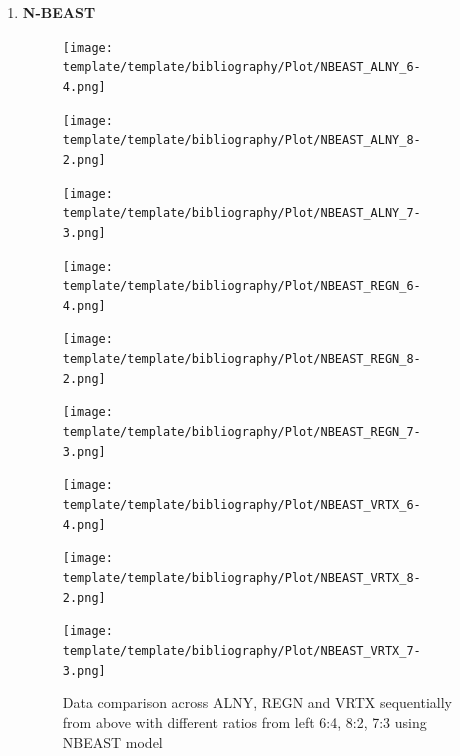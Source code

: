 \documentclass{ieeeojies}
\begin{document}
\begin{enumerate}
\item \textbf{N-BEAST} 
  \begin{figure}[H]
    \centering
    \begin{minipage}{0.155\textwidth}
    \centering
    \texttt{[image: template/template/bibliography/Plot/NBEAST\_ALNY\_6-4.png]}
    \end{minipage}
    \hfill
    \begin{minipage}{0.155\textwidth}
    \centering
    \texttt{[image: template/template/bibliography/Plot/NBEAST\_ALNY\_8-2.png]}
    \end{minipage}
    \hfill
    \begin{minipage}{0.155\textwidth}
    \centering
    \texttt{[image: template/template/bibliography/Plot/NBEAST\_ALNY\_7-3.png]}
    \end{minipage}
    \hfill
    \begin{minipage}{0.155\textwidth}
    \centering
    \texttt{[image: template/template/bibliography/Plot/NBEAST\_REGN\_6-4.png]}
    \end{minipage}
    \hfill
    \begin{minipage}{0.155\textwidth}
    \centering
    \texttt{[image: template/template/bibliography/Plot/NBEAST\_REGN\_8-2.png]}
    \end{minipage}
    \hfill
    \begin{minipage}{0.155\textwidth}
    \centering
    \texttt{[image: template/template/bibliography/Plot/NBEAST\_REGN\_7-3.png]}
    \end{minipage}
    \hfill
    \begin{minipage}{0.155\textwidth}
    \centering
    \texttt{[image: template/template/bibliography/Plot/NBEAST\_VRTX\_6-4.png]}
    \end{minipage}
    \hfill
    \begin{minipage}{0.155\textwidth}
    \centering
    \texttt{[image: template/template/bibliography/Plot/NBEAST\_VRTX\_8-2.png]}
    \end{minipage}
    \hfill
    \begin{minipage}{0.155\textwidth}
    \centering
    \texttt{[image: template/template/bibliography/Plot/NBEAST\_VRTX\_7-3.png]}
    \end{minipage}
\caption{Data comparison across ALNY, REGN and VRTX sequentially from above with different ratios from left 6:4, 8:2, 7:3 using NBEAST model}
\label{fig:combined}
\end{figure}
\end{enumerate}
\end{document}
